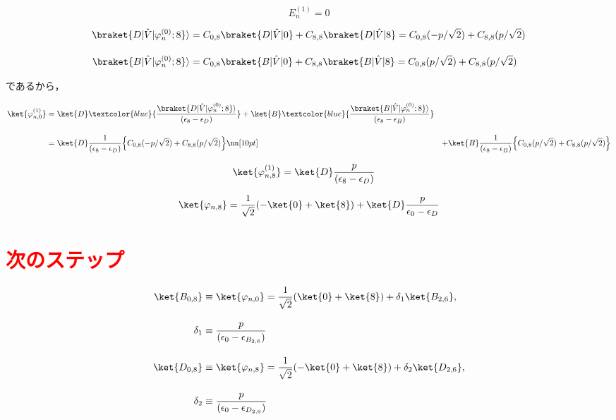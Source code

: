 \begin{equation}
    E^{(1)}_n = 0
\end{equation}

\begin{align}
    \braket{D|\hat{V}|\varphi^{(0)}_n;8}\rangle
    &=C_{0,8}\braket{D|\hat{V}|0} + C_{8,8}\braket{D|\hat{V}|8}
    =C_{0,8}(-p/\sqrt{2}) + C_{8,8} (p/\sqrt{2})\\[10pt]
    \braket{B|\hat{V}|\varphi^{(0)}_n;8}\rangle
    &=C_{0,8}\braket{B|\hat{V}|0} + C_{8,8}\braket{B|\hat{V}|8}
    =C_{0,8}(p/\sqrt{2}) + C_{8,8} (p/\sqrt{2})
\end{align}

であるから，

\begin{align}
    \ket{\varphi_{n,0}^{(1)}}
    &=
    \ket{D}
    \textcolor{blue}{
    \frac{\braket{D|\hat{V}|\varphi^{(0)}_n;8}\rangle}{(\epsilon_{8}-\epsilon_D)}}
    +
    \ket{B}
    \textcolor{blue}{
    \frac{\braket{B|\hat{V}|\varphi^{(0)}_n;8}\rangle}{(\epsilon_8-\epsilon_B)}}\\[10pt]
    &=\ket{D}
    \frac{1}{(\epsilon_{8}-\epsilon_D)}
    \Bigl\{C_{0,8}(-p/\sqrt{2}) + C_{8,8} (p/\sqrt{2})\Bigr\}\nn[10pt]
    &+
    \ket{B}
    \frac{1}{(\epsilon_{8}-\epsilon_B)}
    \Bigl\{C_{0,8}(p/\sqrt{2}) + C_{8,8} (p/\sqrt{2})\Bigr\}
\end{align}


\begin{align}
    \ket{\varphi_{n,8}^{(1)}}
    &=
    \ket{D}
    \frac{p}{(\epsilon_{8}-\epsilon_D)}
\end{align}


\begin{equation}
     \ket{\varphi_{n,8}}
     = \frac{1}{\sqrt{2}}(-\ket{0}+\ket{8}) + \ket{D}\frac{p}{\epsilon_0-\epsilon_{D}}
\end{equation}



\section*{\textcolor{red}{次のステップ}}
\begin{align}
    \ket{B_{0,8}}
    &\equiv\ket{\varphi_{n,0}}
     = \frac{1}{\sqrt{2}}(\ket{0}+\ket{8}) + \delta_1\ket{B_{2,6}},\\[10pt]
     \delta_1 &\equiv \frac{p}{(\epsilon_0-\epsilon_{B_{2,6}})}\\[10pt]
    \ket{D_{0,8}}
    &\equiv\ket{\varphi_{n,8}}
     = \frac{1}{\sqrt{2}}(-\ket{0}+\ket{8}) + \delta_2\ket{D_{2,6}},\\[10pt]
     \delta_2 &\equiv \frac{p}{(\epsilon_0-\epsilon_{D_{2,6}})}
\end{align}

